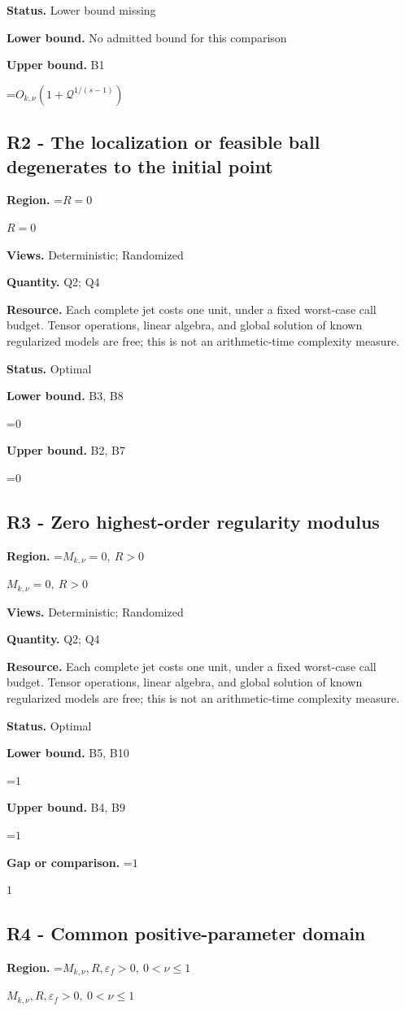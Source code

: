 \documentclass[10pt,a4paper]{article}
\newcommand{\AtlasMath}[1]{\par\begingroup\centering\setbox0=\hbox{$\displaystyle #1$}\ifdim\wd0>1.4\linewidth\typeout{ATLAS WIDE FORMULA: \the\wd0}\fi\ifdim\wd0>\linewidth\resizebox{\linewidth}{!}{\box0}\else\box0\fi\par\endgroup}
\newcommand{\AtlasInlineMath}[1]{\begingroup\setbox0=\hbox{$#1$}\ifdim\wd0>.4\linewidth\endgroup\AtlasMath{#1}\else\endgroup$#1$\fi}
\begin{document}
\textbf{Status.} Lower bound missing

\textbf{Lower bound.} No admitted bound for this comparison

\textbf{Upper bound.} B1

\AtlasMath{O_{k,\nu}(1+\mathcal{Q}^{1/(s-1)})}
\subsection{R2 - The localization or feasible ball degenerates to the initial point}
\textbf{Region.} \AtlasInlineMath{R=0}

\textbf{Views.} Deterministic; Randomized

\textbf{Quantity.} Q2; Q4

\textbf{Resource.} Each complete jet costs one unit, under a fixed worst-case call budget. Tensor operations, linear algebra, and global solution of known regularized models are free; this is not an arithmetic-time complexity measure.

\textbf{Status.} Optimal

\textbf{Lower bound.} B3, B8

\AtlasMath{0}
\textbf{Upper bound.} B2, B7

\AtlasMath{0}
\subsection{R3 - Zero highest-order regularity modulus}
\textbf{Region.} \AtlasInlineMath{M_{k,\nu}=0,\ R>0}

\textbf{Views.} Deterministic; Randomized

\textbf{Quantity.} Q2; Q4

\textbf{Resource.} Each complete jet costs one unit, under a fixed worst-case call budget. Tensor operations, linear algebra, and global solution of known regularized models are free; this is not an arithmetic-time complexity measure.

\textbf{Status.} Optimal

\textbf{Lower bound.} B5, B10

\AtlasMath{1}
\textbf{Upper bound.} B4, B9

\AtlasMath{1}
\textbf{Gap or comparison.} \AtlasInlineMath{1}

\subsection{R4 - Common positive-parameter domain}
\textbf{Region.} \AtlasInlineMath{M_{k,\nu},R,\varepsilon_f>0,\ 0<\nu\le1}
\end{document}
